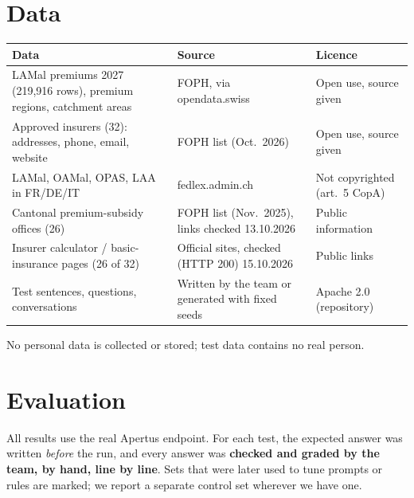 \documentclass[10pt,a4paper]{article}
\newcommand{\entete}[1]{\textsf{\bfseries\footnotesize #1}}
\newcommand{\gras}[1]{\textbf{#1}}
\begin{document}
\section{Data}

\begin{table}[htb]
\begin{tabularx}{\textwidth}{@{}YYl@{}}
\toprule
\entete{Data} & \entete{Source} & \entete{Licence} \\
\midrule
LAMal premiums 2027 (219,916 rows), premium regions, catchment areas & FOPH, via opendata.swiss & Open use, source given \\
Approved insurers (32): addresses, phone, email, website & FOPH list (Oct.\ 2026) & Open use, source given \\
LAMal, OAMal, OPAS, LAA in FR/DE/IT & fedlex.admin.ch & Not copyrighted (art.~5 CopA) \\
Cantonal premium-subsidy offices (26) & FOPH list (Nov.\ 2025), links checked 13.10.2026 & Public information \\
Insurer calculator / basic-insurance pages (26 of 32) & Official sites, checked (HTTP 200) 15.10.2026 & Public links \\
Test sentences, questions, conversations & Written by the team or generated with fixed seeds & Apache 2.0 (repository) \\
\bottomrule
\end{tabularx}
\end{table}

No personal data is collected or stored; test data contains no real person.

\section{Evaluation}

All results use the real Apertus endpoint. For each test, the expected answer was written \emph{before} the run, and every
answer was \gras{checked and graded by the team, by hand, line by line}. Sets that were later used to tune prompts or
rules are marked; we report a separate control set wherever we have one.
\end{document}
